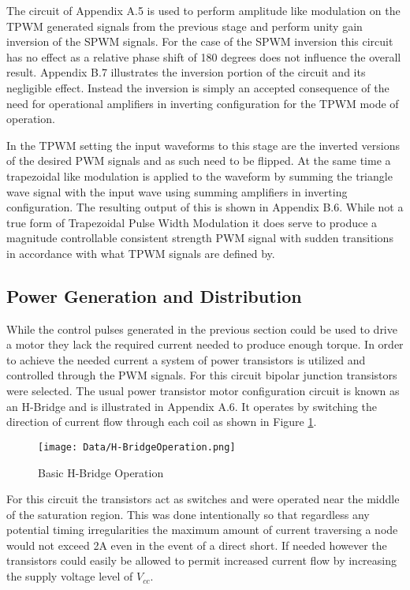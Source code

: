 \documentclass[12pt]{article}
\begin{document}
The circuit of Appendix A.5 is used to perform amplitude like modulation on the TPWM generated signals from the previous stage and perform unity gain inversion of the SPWM signals. For the case of the SPWM inversion this circuit has no effect as a relative phase shift of 180 degrees does not influence the overall result. Appendix B.7 illustrates the inversion portion of the circuit and its negligible effect. Instead the inversion is simply an accepted consequence of the need for operational amplifiers in inverting configuration for the TPWM mode of operation.

In the TPWM setting the input waveforms to this stage are the inverted versions of the desired PWM signals and as such need to be flipped. At the same time a trapezoidal like modulation is applied to the waveform by summing the triangle wave signal with the input wave using summing amplifiers in inverting configuration. The resulting output of this is shown in Appendix B.6. While not a true form of Trapezoidal Pulse Width Modulation it does serve to produce a magnitude controllable consistent strength PWM signal with sudden transitions in accordance with what TPWM signals are defined by.

\subsection{Power Generation and Distribution}%

While the control pulses generated in the previous section could be used to drive a motor they lack the required current needed to produce enough torque. In order to achieve the needed current a system of power transistors is utilized and controlled through the PWM signals. For this circuit bipolar junction transistors were selected. The usual power transistor motor configuration circuit is known as an H-Bridge and is illustrated in Appendix A.6. It operates by switching the direction of current flow through each coil as shown in Figure \ref{HBridge}.

\begin{figure}[H]
\centering
\caption{Basic H-Bridge Operation}
\texttt{[image: Data/H-BridgeOperation.png]}
\label{HBridge}
\end{figure}

For this circuit the transistors act as switches and were operated near the middle of the saturation region. This was done intentionally so that regardless any potential timing irregularities the maximum amount of current traversing a node would not exceed 2A even in the event of a direct short. If needed however the transistors could easily be allowed to permit increased current flow by increasing the supply voltage level of $V_{cc}$.
\pagebreak
\end{document}
